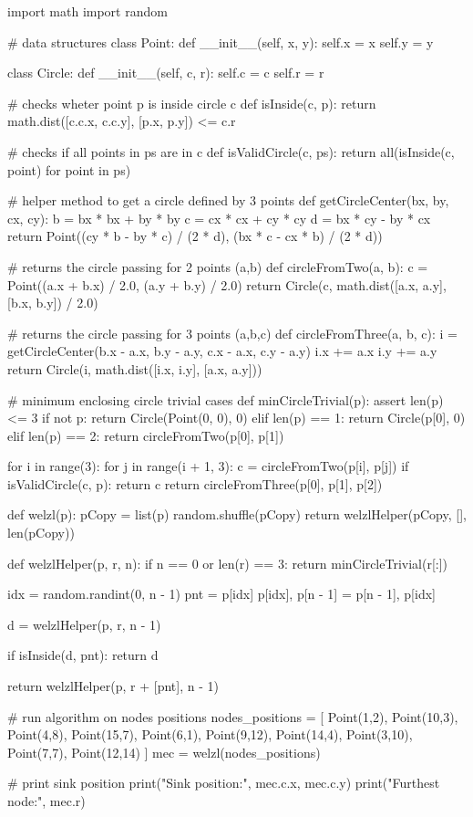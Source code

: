 \begin{python}
import math
import random

# data structures
class Point:
    def __init__(self, x, y):
        self.x = x
        self.y = y

class Circle:
    def __init__(self, c, r):
        self.c = c
        self.r = r

# checks wheter point p is inside circle c 
def isInside(c, p):
    return math.dist([c.c.x, c.c.y], [p.x, p.y]) <= c.r

# checks if all points in ps are in c 
def isValidCircle(c, ps):
    return all(isInside(c, point) for point in ps)

# helper method to get a circle defined by 3 points
def getCircleCenter(bx, by, cx, cy):
    b = bx * bx + by * by
    c = cx * cx + cy * cy
    d = bx * cy - by * cx
    return Point((cy * b - by * c) / (2 * d), (bx * c - cx * b) / (2 * d))

# returns the circle passing for 2 points (a,b)
def circleFromTwo(a, b):
    c = Point((a.x + b.x) / 2.0, (a.y + b.y) / 2.0)
    return Circle(c, math.dist([a.x, a.y], [b.x, b.y]) / 2.0)

# returns the circle passing for 3 points (a,b,c)
def circleFromThree(a, b, c):
    i = getCircleCenter(b.x - a.x, b.y - a.y, c.x - a.x, c.y - a.y)
    i.x += a.x
    i.y += a.y
    return Circle(i, math.dist([i.x, i.y], [a.x, a.y]))

# minimum enclosing circle trivial cases
def minCircleTrivial(p):
    assert len(p) <= 3
    if not p:
        return Circle(Point(0, 0), 0)
    elif len(p) == 1:
        return Circle(p[0], 0)
    elif len(p) == 2:
        return circleFromTwo(p[0], p[1])

    for i in range(3):
        for j in range(i + 1, 3):
            c = circleFromTwo(p[i], p[j])
            if isValidCircle(c, p):
                return c
    return circleFromThree(p[0], p[1], p[2])

def welzl(p):
    pCopy = list(p)
    random.shuffle(pCopy)
    return welzlHelper(pCopy, [], len(pCopy))

def welzlHelper(p, r, n):
    if n == 0 or len(r) == 3:
        return minCircleTrivial(r[:])

    idx = random.randint(0, n - 1)
    pnt = p[idx]
    p[idx], p[n - 1] = p[n - 1], p[idx]

    d = welzlHelper(p, r, n - 1)

    if isInside(d, pnt):
        return d

    return welzlHelper(p, r + [pnt], n - 1)


# run algorithm on nodes positions
nodes_positions = [
    Point(1,2),
    Point(10,3),
    Point(4,8),
    Point(15,7),
    Point(6,1),
    Point(9,12),
    Point(14,4),
    Point(3,10),
    Point(7,7),
    Point(12,14)
]
mec = welzl(nodes_positions)

# print sink position
print("Sink position:", mec.c.x, mec.c.y)
print("Furthest node:", mec.r)
\end{python}

